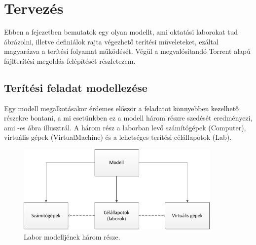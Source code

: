 \chapter{Tervezés}
\label{chp:design}
Ebben a fejezetben bemutatok egy olyan modellt, ami oktatási laborokat tud ábrázolni, illetve definiálok rajta végezhető terítési műveleteket, ezáltal magyarázva a terítési folyamat működését. Végül a megvalósítandó Torrent alapú fájlterítési megoldás felépítését részletezem.

\section{Terítési feladat modellezése}
\label{design_model}

Egy modell megalkotásakor érdemes először a feladatot könnyebben kezelhető részekre bontani, a mi esetünkben ez a modell három részre szedését eredményezi, ami -es ábra illusztrál. A három rész a laborban levő számítógépek (Computer), virtuális gépek (VirtualMachine) és a lehetséges terítési célállapotok (Lab).

\vspace{0.5cm}

\begin{figure}[ht]
	\centering
	\includegraphics[width=100mm, keepaspectratio]{figures/design_modelparts.png}
	\caption{Labor modelljének három része.}
	\label{fig:designmodelparts}
\end{figure}

\vspace{0.5cm}


